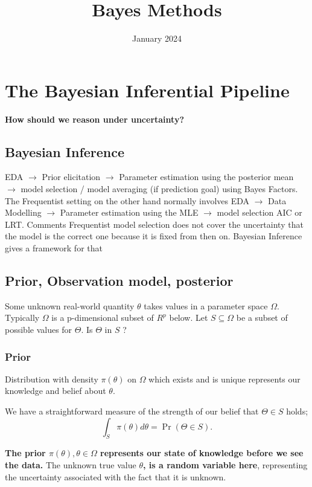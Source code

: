 \documentclass{article}
\title{Bayes Methods}
\date{January 2024}
\begin{document}
\maketitle
\section{The Bayesian Inferential Pipeline}
\textbf{How should we reason under uncertainty? }

\subsection{Bayesian Inference}
EDA $\rightarrow$ Prior elicitation $\rightarrow$ Parameter estimation using the  posterior mean $\rightarrow$ model selection / model averaging (if prediction goal) using Bayes Factors.
\newline
\newline
The Frequentist setting on the other hand normally involves EDA $\rightarrow$ Data Modelling $\rightarrow$ Parameter estimation using the MLE $\rightarrow$ model selection AIC or LRT.
\newline
\textbf{}{Comments}
 Frequentist model selection does not cover the uncertainty that the model is the correct one because it is fixed from then on. Bayesian Inference gives a framework for that

\subsection{Prior, Observation model, posterior}

Some unknown real-world quantity $\theta$ takes values in a parameter space $\Omega$. Typically $\Omega$ is a p-dimensional subset of $R^p$ below. Let $S \subseteq \Omega$ be a subset of possible values for $\Theta$. Is $\Theta$ in $S$ ?

\subsubsection{Prior}
Distribution  with density $\pi(\theta)$ on $\Omega$ which exists and is unique represents our  knowledge and belief about $\theta$.

We have a straightforward measure of the strength of our belief that $\Theta \in S$ holds;
$$
\int_S \pi(\theta) d \theta=\operatorname{Pr}(\Theta \in S) .
$$

\textbf{The prior $\pi(\theta), \theta \in \Omega$ represents our state of knowledge before we see the data.} The unknown true value \textbf{$\theta$, is a random variable here}, representing the uncertainty associated with the fact that it is unknown. 
\end{document}
